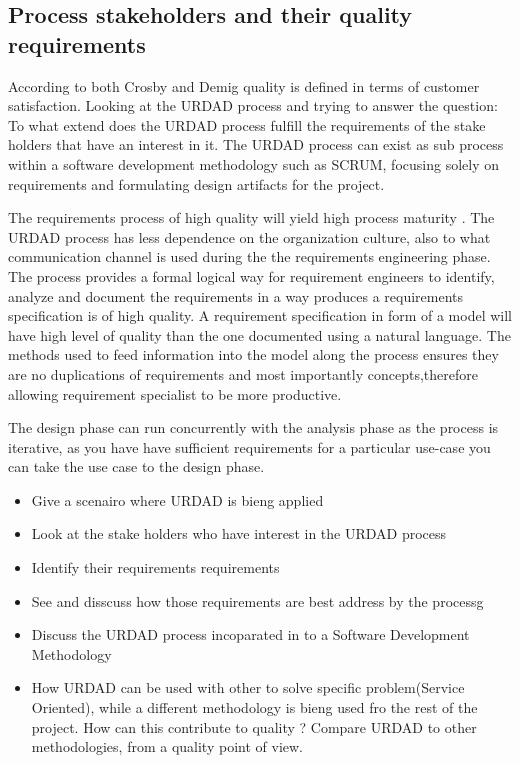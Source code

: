 
\subsection{Process stakeholders and their quality requirements}

According to both Crosby and Demig quality is defined in terms of customer satisfaction. Looking at the URDAD process and trying to answer the 
question: To what extend does the URDAD process fulfill the requirements of the stake holders that have an interest in it. The URDAD process can
exist as sub process within a software development methodology such as SCRUM, focusing solely on requirements and formulating design 
artifacts for the project.


The requirements process of high quality will yield high process maturity \cite  {Boehm_20Viev_Century_SE}. The URDAD process has
less dependence on the organization culture, also to what communication channel is used during the the requirements 
engineering phase. The process provides a formal logical way for requirement engineers to identify, analyze and document 
the requirements in a way produces a requirements specification is of high quality. A requirement specification in form of a model will 
have high level of quality than the one documented using a natural language. The methods used to feed information into the model along the process 
ensures they are no duplications of requirements and most importantly concepts,therefore allowing requirement specialist to be more productive. 


The design phase can run concurrently with the analysis phase as the process is iterative, as you have have sufficient requirements for a 
particular use-case you can take the use case to the design phase. 

 

\begin {itemize}
 \item Give a scenairo where URDAD is bieng applied
 \item Look at the stake holders who have interest in the URDAD process 
 \item Identify their requirements requirements
 \item See and disscuss how those requirements are best address by the processg
\end {itemize}

\begin {itemize}
 \item Discuss the URDAD process incoparated in to a Software Development Methodology
 \item How URDAD can be used with other to solve specific problem(Service Oriented),
  while a different methodology is bieng used fro the rest of the project. How can this contribute to quality ?
  Compare URDAD to other methodologies, from a quality point of view.
\end {itemize}


